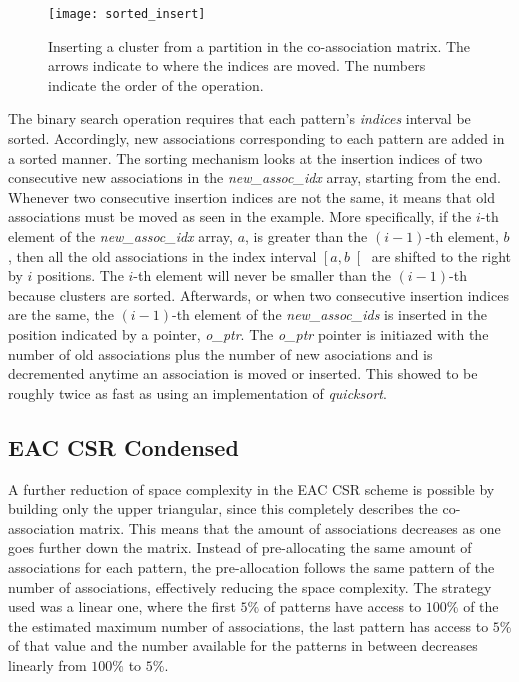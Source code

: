 \begin{figure}[hbtp]
\centering
\texttt{[image: sorted\_insert]}
\caption{Inserting a cluster from a partition in the co-association matrix. The arrows indicate to where the indices are moved. The numbers indicate the order of the operation.}
\label{fig:normal part}
\end{figure}


The binary search operation requires that each pattern's \emph{indices} interval be sorted.
Accordingly, new associations corresponding to each pattern are added in a sorted manner.
The sorting mechanism looks at the insertion indices of two consecutive new associations in the \emph{new\_assoc\_idx} array, starting from the end.
Whenever two consecutive insertion indices are not the same, it means that old associations must be moved as seen in the example.
More specifically, if the $i$-th element of the \emph{new\_assoc\_idx} array, $a$, is greater than the $(i-1)$-th element, $b$, then all the old  associations in the index interval $ \left [ a,b  \right [$ are shifted to the right by $i$ positions. %
The $i$-th element will never be smaller than the $(i-1)$-th because clusters are sorted.
Afterwards, or when two consecutive insertion indices are the same, the $(i-1)$-th element of the \emph{new\_assoc\_ids} is inserted in the position indicated by a pointer, \emph{o\_ptr}.
The \emph{o\_ptr} pointer is initiazed with the number of old associations plus the number of new asociations and is decremented anytime an association is moved or inserted.
This showed to be roughly twice as fast as using an implementation of \emph{quicksort}.


\subsection{EAC CSR Condensed}

\noindent A further reduction of space complexity in the EAC CSR scheme is possible by building only the upper triangular, since this completely describes the co-association matrix.
This means that the amount of associations decreases as one goes further down the matrix.
Instead of pre-allocating the same amount of associations for each pattern, the pre-allocation follows the same pattern of the number of associations, effectively reducing the space complexity.
The strategy used was a linear one, where the first $5\%$ of patterns have access to $100\%$ of the the estimated maximum number of associations, the last pattern has access to $5\%$ of that value and the number available for the patterns in between decreases linearly from $100\%$ to $5\%$.